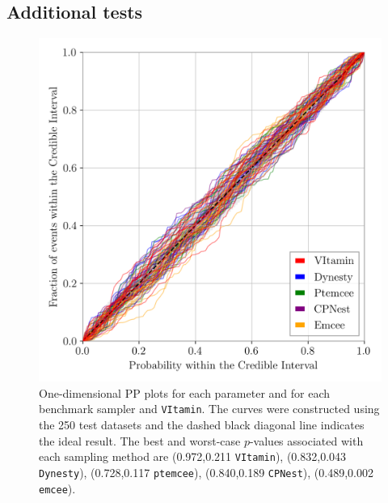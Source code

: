 \documentclass[%
showpacs,
nofootinbib,
 amsmath,amssymb,
 aps,
 twocolumn,
 prl,
 reprint,
floatfix,
]{revtex4-1}
\begin{document}
\subsection{Additional tests}
%
%
\begin{figure}
    \includegraphics[width=\columnwidth]{latest_pp_plot.png}
    \caption{\label{fig:pp_plot} One-dimensional \ac{PP} plots for each
parameter and for each benchmark sampler and \texttt{VItamin}. The curves were
constructed using the 250 test datasets and the dashed black diagonal line
indicates the ideal result. The best and worst-case $p$-values associated with each
sampling method are (0.972,0.211 \texttt{VItamin}), (0.832,0.043 \texttt{Dynesty}), (0.728,0.117
\texttt{ptemcee}), (0.840,0.189 \texttt{CPNest}), (0.489,0.002 \texttt{emcee}). 
}
\end{figure}
%
\end{document}
